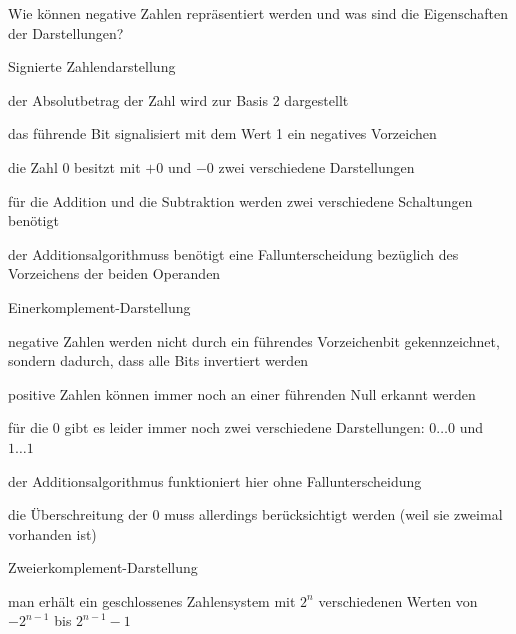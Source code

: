 \documentclass
[
  draft    = true,
  fontsize = 11pt,
  parskip  = half-,
  BCOR     = 0pt,
  DIV      = 11,
  ngerman,
  dvipsnames
]
{scrartcl}
\begin{document}
\begin{mytemize}
  \item Wie können negative Zahlen repräsentiert werden und was sind die Eigenschaften der Darstellungen?
        \begin{achim}
          \begin{mytemize}
            \item Signierte Zahlendarstellung
                  \begin{mytemize}
                    \item der Absolutbetrag der Zahl wird zur Basis 2 dargestellt
                    \item das führende Bit signalisiert mit dem Wert 1 ein negatives Vorzeichen
                    \item die Zahl 0 besitzt mit $+0$ und $-0$ zwei verschiedene Darstellungen
                    \item für die Addition und die Subtraktion werden zwei verschiedene Schaltungen benötigt
                    \item der Additionsalgorithmuss benötigt eine Fallunterscheidung bezüglich des Vorzeichens der beiden Operanden
                  \end{mytemize}
            \item Einerkomplement-Darstellung
                  \begin{mytemize}
                    \item negative Zahlen werden nicht durch ein führendes Vorzeichenbit gekennzeichnet,
                          sondern dadurch, dass alle Bits invertiert werden
                    \item positive Zahlen können immer noch an einer führenden Null erkannt werden
                    \item für die 0 gibt es leider immer noch zwei verschiedene Darstellungen: $0\ldots0$ und $1\ldots1$
                    \item der Additionsalgorithmus funktioniert hier ohne Fallunterscheidung
                    \item die Überschreitung der 0 muss allerdings berücksichtigt werden (weil sie zweimal vorhanden ist)
                  \end{mytemize}
            \item Zweierkomplement-Darstellung
                  \begin{mytemize}
                    \item man erhält ein geschlossenes Zahlensystem mit $2^n$ verschiedenen Werten von $-2^{n-1}$ bis $2^{n-1}-1$

\end{mytemize}
\end{mytemize}
\end{achim}
\end{mytemize}
\end{document}
